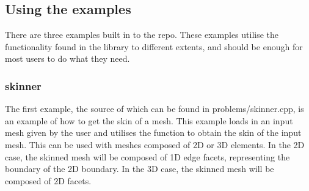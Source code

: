 \documentclass[12pt, letterpaper]{article}
\begin{document}
\subsection{Using the examples}
There are three examples built in to the repo. These examples utilise  the functionality found in the library to different extents, and should be enough for most users to do what they need.

\subsubsection{skinner}
The first example, the source of which can be found in problems/skinner.cpp, is an example of how to get the skin of a mesh. This example loads in an input mesh given by the user and utilises the function  to obtain the skin of the input mesh. This can be used with meshes composed of 2D or 3D elements. In the 2D case, the skinned mesh will be composed of 1D edge facets, representing the boundary of the 2D boundary. In the 3D case, the skinned mesh will be composed of 2D facets. 
\end{document}
